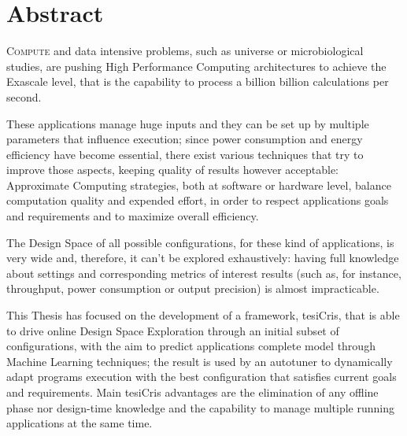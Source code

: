 \chapter*{Abstract}

\lettrine{C}{ompute} and data intensive problems, such as universe or microbiological studies, are pushing High Performance Computing architectures to achieve the Exascale level, that is the capability to process a billion billion calculations per second.

These applications manage huge inputs and they can be set up by multiple parameters that influence execution; since power consumption and energy efficiency have become essential, there exist various techniques that try to improve those aspects, keeping quality of results however acceptable: Approximate Computing strategies, both at software or hardware level, balance computation quality and expended effort, in order to respect applications goals and requirements and to maximize overall efficiency.

The Design Space of all possible configurations, for these kind of applications, is very wide and, therefore, it can't be explored exhaustively: having full knowledge about settings and corresponding metrics of interest results (such as, for instance, throughput, power consumption or output precision) is almost impracticable.

This Thesis has focused on the development of a framework, tesiCris, that is able to drive online Design Space Exploration through an initial subset of configurations, with the aim to predict applications complete model through Machine Learning techniques; the result is used by an autotuner to dynamically adapt programs execution with the best configuration that satisfies current goals and requirements. Main tesiCris advantages are the elimination of any offline phase nor design-time knowledge and the capability to manage multiple running applications at the same time.
